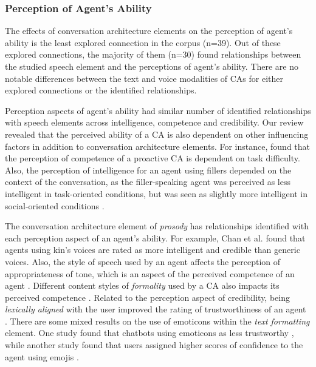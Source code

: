 \subsubsection{Perception of Agent's Ability}

The effects of conversation architecture elements on the perception of agent's ability is the least explored connection in the corpus (n=39). Out of these explored connections, the majority of them (n=30) found relationships between the studied speech element and the perceptions of agent's ability. There are no notable differences between the text and voice modalities of CAs for either explored connections or the identified relationships.

Perception aspects of agent's ability had similar number of identified relationships with speech elements across intelligence, competence and credibility. Our review revealed that the perceived ability of a CA is also dependent on other influencing factors in addition to conversation architecture elements. For instance, \citet{kraus2020effects}\cmt{[64]} found that the perception of competence of a proactive CA is dependent on task difficulty. Also, the perception of intelligence for an agent using fillers depended on the context of the conversation, as the filler-speaking agent was perceived as less intelligent in task-oriented conditions, but was seen as slightly more intelligent in social-oriented conditions \cite{jeong2019exploring}\cmt{[10]}.

The conversation architecture element of \textit{prosody} has relationships identified with each perception aspect of an agent's ability. For example, Chan et al. \cite{chan2021kinvoices}\cmt{[74]} found that agents using kin's voices are rated as more intelligent and credible than generic voices. Also, the style of speech used by an agent affects the perception of appropriateness of tone, which is an aspect of the perceived competence of an agent \cite{misu2011toward}\cmt{[83]}. Different content styles of \textit{formality} used by a CA also impacts its perceived competence \cite{cox2022does, jestin2022effects}\cmt{[27][81]}. Related to the perception aspect of credibility, being \textit{lexically aligned} with the user improved the rating of trustworthiness of an agent \cite{hoegen2019end, linnemann2018can}\cmt{[31][15]}. There are some mixed results on the use of emoticons within the \textit{text formatting} element. One study found that chatbots using emoticons as less trustworthy \cite{wilhelm2022keep}\cmt{[28]}, while another study found that users assigned higher scores of confidence to the agent using emojis \cite{fadhil2018effect}\cmt{[52]}. 

